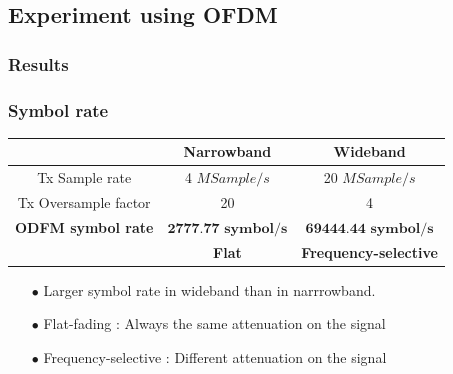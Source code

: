 \documentclass[11pt]{beamer}
\begin{document}
\subsection{Experiment using OFDM}
\subsubsection{Results}

\begin{frame}
\frametitle{Symbol rate}
\begin{center}
	\begin{tabular}{c|c|c}
		  & Narrowband & Wideband\\
		  \hline
	Tx Sample rate & 4 $MSample/s$ & 20 $MSample/s$ \\	  
	Tx Oversample factor & 20 & 4\\
	\textbf{ODFM symbol rate} &  $\textbf{2777.77 symbol/s}$ & $\textbf{69444.44 symbol/s}$ \\ 
	\hline
     & \color{red} \textbf{Flat}  & \color{red} \textbf{Frequency-selective}\\                               
	\end{tabular}
	\label{tab1}
\end{center}
\begin{itemize}
\item[$\bullet$] Larger symbol rate in wideband than in narrrowband.
\item[$\bullet$] Flat-fading : Always the same attenuation on the signal
\item[$\bullet$] Frequency-selective : Different attenuation on the signal
\end{itemize}

\end{frame}
\end{document}
